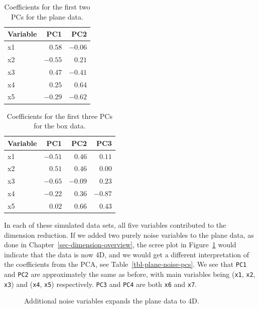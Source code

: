 \documentclass[
  letterpaper,
]{krantz}
\begin{document}

\begin{longtable}{lrr}

\caption{\label{tbl-plane-pcs}Coefficients for the first two PCs for the
plane data.}

\tabularnewline

\toprule
Variable & PC1 & PC2 \\ 
\midrule
x1 & $0.58$ & $-0.06$ \\ 
x2 & $-0.55$ & $0.21$ \\ 
x3 & $0.47$ & $-0.41$ \\ 
x4 & $0.25$ & $0.64$ \\ 
x5 & $-0.29$ & $-0.62$ \\ 
\bottomrule

\end{longtable}

\begin{longtable}{lrrr}

\caption{\label{tbl-box-pcs}Coefficients for the first three PCs for the
box data.}

\tabularnewline

\toprule
Variable & PC1 & PC2 & PC3 \\ 
\midrule
x1 & $-0.51$ & $0.46$ & $0.11$ \\ 
x2 & $0.51$ & $0.46$ & $0.00$ \\ 
x3 & $-0.65$ & $-0.09$ & $0.23$ \\ 
x4 & $-0.22$ & $0.36$ & $-0.87$ \\ 
x5 & $0.02$ & $0.66$ & $0.43$ \\ 
\bottomrule

\end{longtable}

In each of these simulated data sets, all five variables contributed to
the dimension reduction. If we added two purely noise variables to the
plane data, as done in Chapter~\ref{sec-dimension-overview}, the scree
plot in Figure~\ref{fig-plane-noise-scree} would indicate that the data
is now 4D, and we would get a different interpretation of the
coefficients from the PCA, see Table~\ref{tbl-plane-noise-pcs}. We see
that \texttt{PC1} and \texttt{PC2} are approximately the same as before,
with main variables being (\texttt{x1}, \texttt{x2}, \texttt{x3}) and
(\texttt{x4}, \texttt{x5}) respectively. \texttt{PC3} and \texttt{PC4}
are both \texttt{x6} and \texttt{x7}.

\begin{figure}


\caption{\label{fig-plane-noise-scree}Additional noise variables expands
the plane data to 4D.}

\end{figure}%
\end{document}
